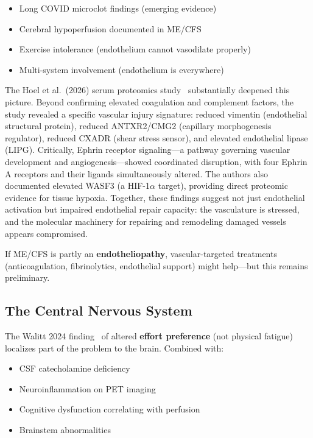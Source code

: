 \begin{itemize}
    \item Long COVID microclot findings (emerging evidence)
    \item Cerebral hypoperfusion documented in ME/CFS~\cite{VanCampenEtAl2020}
    \item Exercise intolerance (endothelium cannot vasodilate properly)
    \item Multi-system involvement (endothelium is everywhere)
\end{itemize}

The Hoel et al.\ (2026) serum proteomics study~\cite{Hoel2026proteome} substantially deepened this picture. Beyond confirming elevated coagulation and complement factors, the study revealed a specific vascular injury signature: reduced vimentin (endothelial structural protein), reduced ANTXR2/CMG2 (capillary morphogenesis regulator), reduced CXADR (shear stress sensor), and elevated endothelial lipase (LIPG). Critically, Ephrin receptor signaling---a pathway governing vascular development and angiogenesis---showed coordinated disruption, with four Ephrin A receptors and their ligands simultaneously altered. The authors also documented elevated WASF3 (a HIF-1$\alpha$ target), providing direct proteomic evidence for tissue hypoxia. Together, these findings suggest not just endothelial activation but impaired endothelial repair capacity: the vasculature is stressed, and the molecular machinery for repairing and remodeling damaged vessels appears compromised.

If ME/CFS is partly an \textbf{endotheliopathy}, vascular-targeted treatments (anticoagulation, fibrinolytics, endothelial support) might help---but this remains preliminary.

\subsection{The Central Nervous System}

The Walitt 2024 finding~\cite{walitt2024deep} of altered \textbf{effort preference} (not physical fatigue) localizes part of the problem to the brain. Combined with:

\begin{itemize}
    \item CSF catecholamine deficiency~\cite{walitt2024deep}
    \item Neuroinflammation on PET imaging~\cite{Nakatomi2014neuroinflammation}
    \item Cognitive dysfunction correlating with perfusion~\cite{VanCampenEtAl2020}
    \item Brainstem abnormalities~\cite{walitt2024deep}
\end{itemize}

